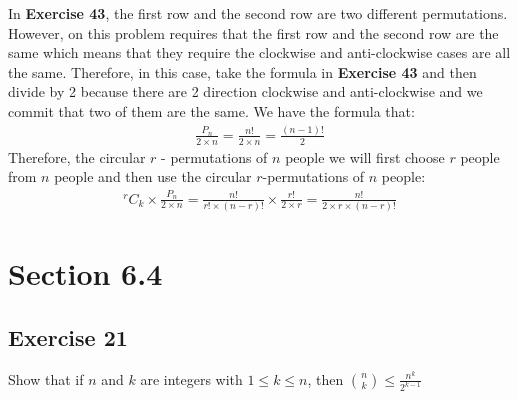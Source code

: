 \documentclass{article}
\theoremstyle{mytheoremstyle}
\theoremstyle{mytheoremstyle}
\theoremstyle{myproblemstyle}
\begin{document}
    In \textbf{Exercise 43}, the first row and the second row are two different permutations. However, on this
    problem requires that the first row and the second row are the same which means that they require the clockwise
    and anti-clockwise cases are all the same. Therefore, in this case, take the formula in \textbf{Exercise 43} and
    then divide by 2 because there are 2 direction clockwise and anti-clockwise and we commit that two of them
    are the same. We have the formula that:
    \begin{align*}
        \frac{P_n}{2 \times n} = \frac{n!}{2 \times n} = \frac{(n - 1)!}{2}
    \end{align*}
    Therefore, the circular \(r\) - permutations of \(n\) people we will first choose \(r\) people from \(n\) people and then
    use the circular \(r\)-permutations of \(n\) people:
    \begin{align*}
        ^rC_k \times \frac{P_n}{2 \times n} = \frac{n!}{r! \times (n - r)!} \times \frac{r!}{2 \times r} = \frac{n!}{2 \times r \times (n -r)!}
    \end{align*}
    \section*{Section 6.4}
    \subsection*{Exercise 21}
    Show that if \(n\) and \(k\) are integers with \(1 \leq k \leq n\), then \(\binom{n}{k} \leq \frac{n^k}{2^{k - 1}}\)
\end{document}
